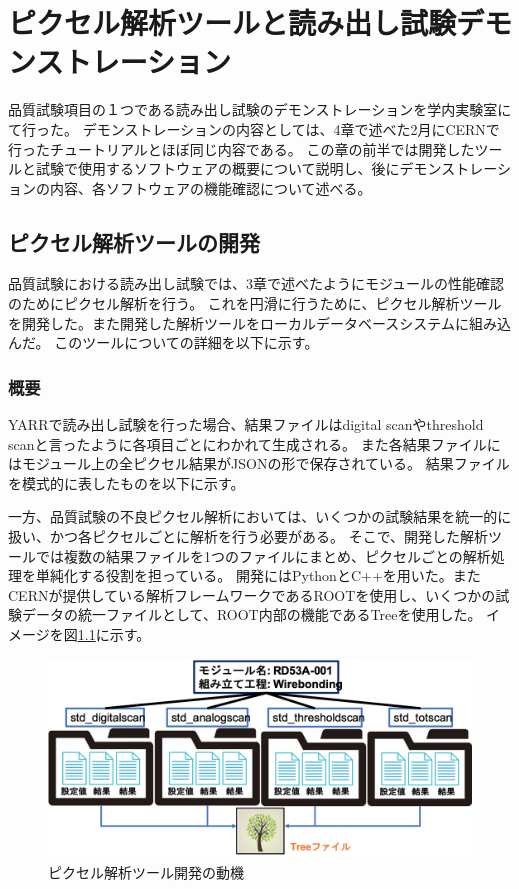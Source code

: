 \chapter{ピクセル解析ツールと読み出し試験デモンストレーション}
品質試験項目の１つである読み出し試験のデモンストレーションを学内実験室にて行った。
デモンストレーションの内容としては、4章で述べた2月にCERNで行ったチュートリアルとほぼ同じ内容である。
この章の前半では開発したツールと試験で使用するソフトウェアの概要について説明し、後にデモンストレーションの内容、各ソフトウェアの機能確認について述べる。

\section{ピクセル解析ツールの開発}
品質試験における読み出し試験では、3章で述べたようにモジュールの性能確認のためにピクセル解析を行う。
これを円滑に行うために、ピクセル解析ツールを開発した。また開発した解析ツールをローカルデータベースシステムに組み込んだ。
このツールについての詳細を以下に示す。

\subsection{概要}
YARRで読み出し試験を行った場合、結果ファイルはdigital scanやthreshold scanと言ったように各項目ごとにわかれて生成される。
また各結果ファイルにはモジュール上の全ピクセル結果がJSONの形で保存されている。
結果ファイルを模式的に表したものを以下に示す。

一方、品質試験の不良ピクセル解析においては、いくつかの試験結果を統一的に扱い、かつ各ピクセルごとに解析を行う必要がある。
そこで、開発した解析ツールでは複数の結果ファイルを1つのファイルにまとめ、ピクセルごとの解析処理を単純化する役割を担っている。
開発にはPythonとC++を用いた。またCERNが提供している解析フレームワークであるROOTを使用し、いくつかの試験データの統一ファイルとして、ROOT内部の機能であるTreeを使用した。
イメージを図\ref{analysis_tool_motivation}に示す。

\begin{figure}[bpt]\centering
\includegraphics[width=12cm]{analysis_tool_motivation}
\caption[ピクセル解析ツール開発の動機]{ピクセル解析ツール開発の動機}
\label{analysis_tool_motivation}
\end{figure}

